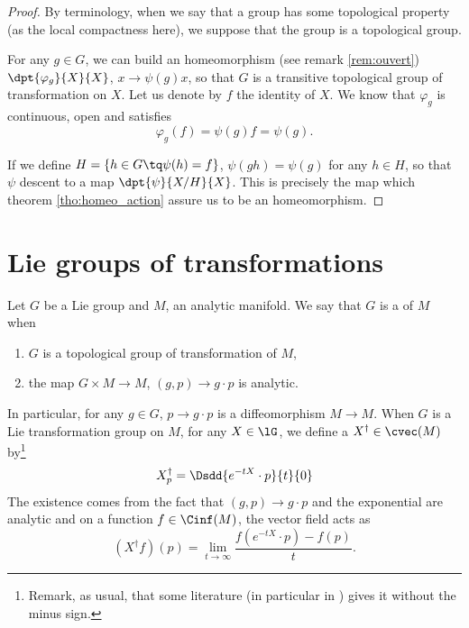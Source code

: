 \begin{proof}
By terminology, when we say that a group has some topological property (as the local compactness here), we suppose that the group is a topological group.

For any $g\in G$, we can build an homeomorphism (see remark \ref{rem:ouvert}) $\dpt{\varphi_g}{X}{X}$, $x\to \psi(g)x$, so that $G$ is  a transitive topological group of transformation on $X$. Let us denote by $f$ the identity of $X$. We know that $\varphi_g$ is continuous, open and satisfies 
\[
   \varphi_g(f)=\psi(g)f=\psi(g).
\]

If we define $H=\{h\in G\tq \psi(h)=f\}$, $\psi(gh)=\psi(g)$ for any $h\in H$, so that $\psi$ descent to a map $\dpt{\psi}{X/H}{X}$. This is precisely the map which theorem \ref{tho:homeo_action} assure us to be an homeomorphism.

\end{proof}

\section{Lie groups of transformations}

\begin{definition}
Let $G$ be a Lie group and $M$, an analytic manifold. We say that $G$ is a  of $M$ when

\begin{enumerate}
\item $G$ is a topological group of transformation of $M$,
\item the map $G\times M\to M$, $(g,p)\to g\cdot p$ is analytic.
\end{enumerate}
\label{DefLieGpTransfo}
\end{definition}

In particular, for any $g\in G$, $p\to g\cdot p$ is a diffeomorphism $M\to M$. When $G$ is a Lie transformation group on $M$, for any $X\in\lG$, we define a  $X^{\dag}\in\cvec(M)$ by\footnote{Remark, as usual, that some literature (in particular in \cite{Helgason}) gives it without the minus sign.} 
\begin{equation}
  X^{\dag}_p=\Dsdd{e^{-tX}\cdot p}{t}{0}
\end{equation}
The existence comes from the fact that $(g,p)\to g\cdot p$ and the exponential are analytic and on a function $f\in\Cinf(M)$, the vector field acts as
\[
   (X^{\dag} f)(p)=\lim_{t\to\infty}\frac{ f(e^{-tX}\cdot p)-f(p) }{t}.
\]

